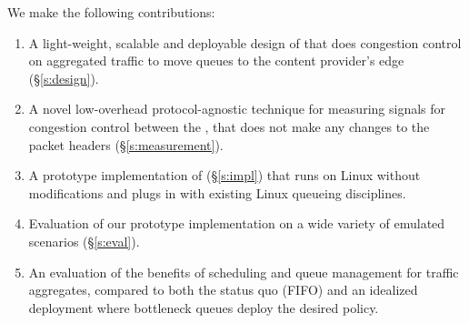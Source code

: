 We make the following contributions:
\begin{enumerate}
     \item A light-weight, scalable and deployable design of \name that does congestion control on aggregated traffic to move queues to the content provider's edge (\S\ref{s:design}).  
     \item A novel low-overhead protocol-agnostic technique for measuring signals for congestion control between the \pair, that does not make any changes to the packet headers (\S\ref{s:measurement}). 
     \item A prototype implementation of \name (\S\ref{s:impl}) that runs on Linux without modifications and plugs in with existing Linux queueing disciplines.
     \item Evaluation of our prototype implementation on a wide variety of emulated scenarios (\S\ref{s:eval}).
     \item An evaluation of the benefits of scheduling and queue management for traffic aggregates, compared to both the status quo (FIFO) and an idealized deployment where bottleneck queues deploy the desired policy.
 \end{enumerate}



